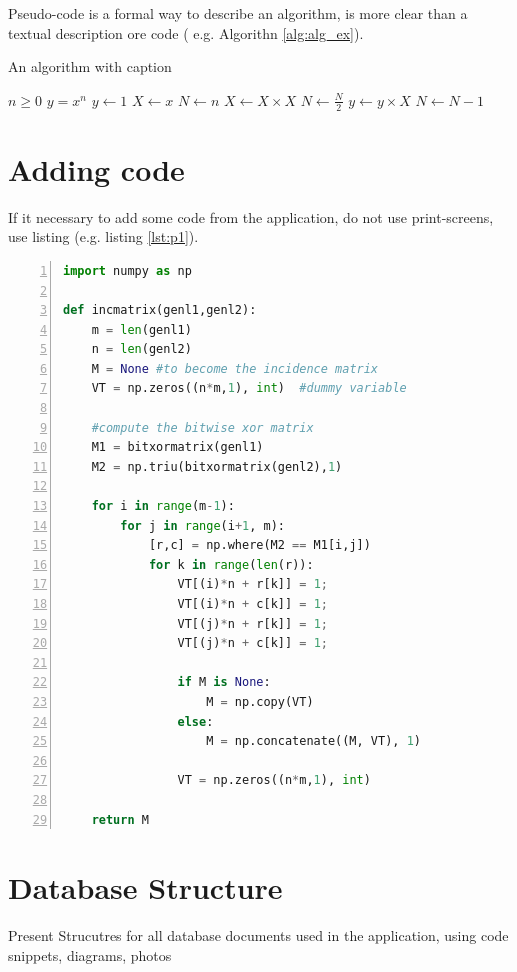 Pseudo-code is a formal way to describe an algorithm, is more clear than a textual description ore code ( e.g. Algorithn \ref{alg:alg_ex}).

\begin{algorithm}[!ht]
\caption{An algorithm with caption}\label{alg:alg_ex}
\begin{algorithmic}[1]
\Require $n \geq 0$
\Ensure $y = x^n$
\State $y \gets 1$
\State $X \gets x$
\State $N \gets n$
    \State $X \gets X \times X$
    \State $N \gets \frac{N}{2}$  
    \State $y \gets y \times X$
    \State $N \gets N - 1$
\EndIf
\EndWhile
\end{algorithmic}
\end{algorithm}

\section{Adding code}
If it necessary to add  some code from the application, do not use print-screens, use  listing  (e.g. listing \ref{lst:p1}).
\begin{lstlisting}[language=Python, numbers=left,
    stepnumber=1, caption=Un exemplu de cod python, label=lst:p1]
import numpy as np
    
def incmatrix(genl1,genl2):
    m = len(genl1)
    n = len(genl2)
    M = None #to become the incidence matrix
    VT = np.zeros((n*m,1), int)  #dummy variable
    
    #compute the bitwise xor matrix
    M1 = bitxormatrix(genl1)
    M2 = np.triu(bitxormatrix(genl2),1) 

    for i in range(m-1):
        for j in range(i+1, m):
            [r,c] = np.where(M2 == M1[i,j])
            for k in range(len(r)):
                VT[(i)*n + r[k]] = 1;
                VT[(i)*n + c[k]] = 1;
                VT[(j)*n + r[k]] = 1;
                VT[(j)*n + c[k]] = 1;
                
                if M is None:
                    M = np.copy(VT)
                else:
                    M = np.concatenate((M, VT), 1)
                
                VT = np.zeros((n*m,1), int)
    
    return M
\end{lstlisting}

\section{Database Structure}

Present Strucutres for all database documents used in the application, using code snippets, diagrams, photos